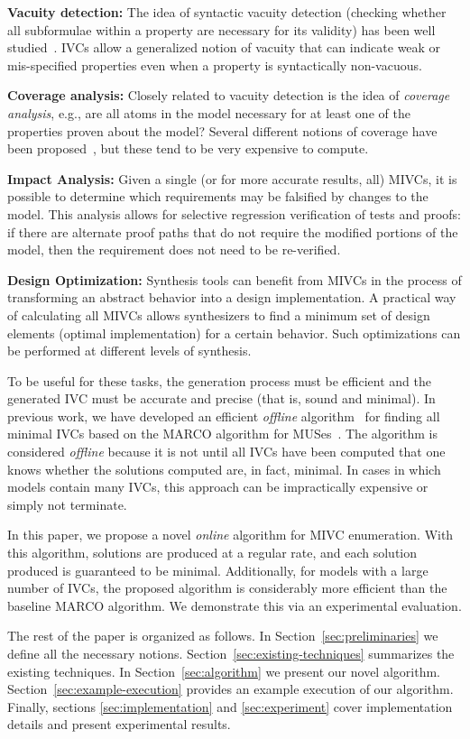 \noindent \textbf{Vacuity detection:} The idea of syntactic vacuity detection (checking whether all subformulae within a property are necessary for its validity) has been well studied~\cite{Kupferman03:Vacuity}.   IVCs allow a generalized notion of vacuity that can indicate weak or mis-specified properties even when a property is syntactically non-vacuous.

\noindent \textbf{Coverage analysis:} Closely related to vacuity detection is the idea of {\em coverage analysis}, e.g., are all atoms in the model necessary for at least one of the properties proven about the model?  Several different notions of coverage have been proposed~\cite{chockler_coverage_2003,kupferman_theory_2008}, but these tend to be very expensive to compute.

\noindent \textbf{Impact Analysis:} Given a single (or for more accurate results, all) MIVCs, it is possible to determine which requirements may be falsified by changes to the model.  This analysis allows for selective regression verification of tests and proofs: if there are alternate proof paths that do not require the modified portions of the model, then the requirement does not need to be re-verified.

\noindent \textbf{Design Optimization:} Synthesis tools can benefit from MIVCs in the process of transforming an abstract behavior into a design implementation. A practical way of calculating all MIVCs allows synthesizers to find a minimum set of design elements (optimal implementation) for a certain behavior. Such optimizations can be performed at different levels of synthesis.

To be useful for these tasks, the generation process must be efficient and the generated IVC must be accurate and precise (that is, sound and minimal).  In previous work, we have developed an efficient {\em offline} algorithm~\cite{Ghass17AllIVCs} for finding all minimal IVCs based on the MARCO algorithm for MUSes~\cite{marco2016fast}.  The algorithm is considered {\em offline} because it is not until all IVCs have been computed that one knows whether the solutions computed are, in fact, minimal.  In cases in which models contain many IVCs, this approach can be impractically expensive or simply not terminate.

In this paper, we propose a novel {\em online} algorithm for MIVC enumeration.  With this algorithm, solutions are produced at a regular rate, and each solution produced is guaranteed to be minimal.  Additionally, for models with a large number of IVCs, the proposed algorithm is considerably more efficient than the baseline MARCO algorithm.  We demonstrate this via an experimental evaluation.

The rest of the paper is organized as follows. In Section~\ref{sec:preliminaries} we define all the necessary notions. Section~\ref{sec:existing-techniques} summarizes the existing techniques. In Section~\ref{sec:algorithm} we present our novel algorithm. Section~\ref{sec:example-execution} provides an example execution of our algorithm. Finally, sections \ref{sec:implementation} and \ref{sec:experiment} cover implementation details and present experimental results. 	

